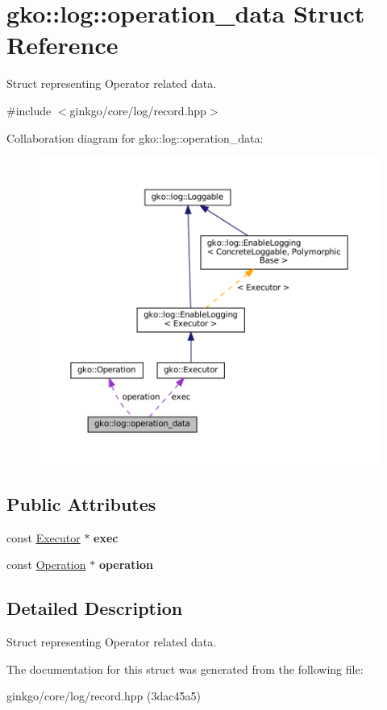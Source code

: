 \hypertarget{structgko_1_1log_1_1operation__data}{}\section{gko\+:\+:log\+:\+:operation\+\_\+data Struct Reference}
\label{structgko_1_1log_1_1operation__data}


Struct representing Operator related data.  




{\ttfamily \#include $<$ginkgo/core/log/record.\+hpp$>$}



Collaboration diagram for gko\+:\+:log\+:\+:operation\+\_\+data\+:
\nopagebreak
\begin{figure}[H]
\begin{center}
\leavevmode
\includegraphics[width=350pt]{structgko_1_1log_1_1operation__data__coll__graph}
\end{center}
\end{figure}
\subsection*{Public Attributes}
\begin{DoxyCompactItemize}
\item 
\mbox{\label{structgko_1_1log_1_1operation__data_ad5a3a3e76a8dc5b8ca240084585fd6e7}} 
const \hyperlink{classgko_1_1Executor}{Executor} $\ast$ {\bfseries exec}
\item 
\mbox{\label{structgko_1_1log_1_1operation__data_a92dc7de984a101b8f93a05d3f3502d7c}} 
const \hyperlink{classgko_1_1Operation}{Operation} $\ast$ {\bfseries operation}
\end{DoxyCompactItemize}


\subsection{Detailed Description}
Struct representing Operator related data. 

The documentation for this struct was generated from the following file\+:\begin{DoxyCompactItemize}
\item 
ginkgo/core/log/record.\+hpp (3dac45a5)\end{DoxyCompactItemize}
